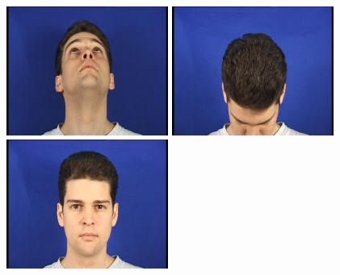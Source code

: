 \begin{figure}
\begin{center}
  \includegraphics[width=\textwidth/4]{ch4/figures/charles_u1.jpg}
  \includegraphics[width=\textwidth/4]{ch4/figures/charles_d1.jpg}
  \includegraphics[width=\textwidth/4]{ch4/figures/charles_c2.jpg}

\end{center}
\end{figure}
